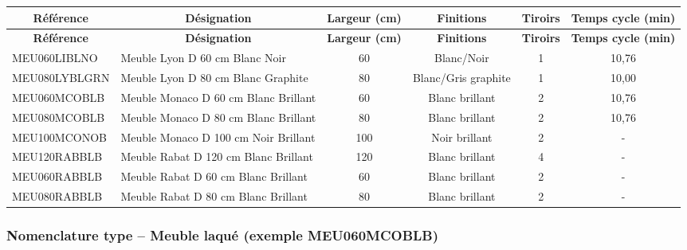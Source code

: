 \documentclass[12pt,a4paper]{article}
\begin{document}
\begin{longtable}{|p{4cm}|p{5cm}|c|c|c|c|}
\hline
\multicolumn{1}{|c|}{\textbf{Référence}} & \multicolumn{1}{c|}{\textbf{Désignation}} & \multicolumn{1}{c|}{\textbf{Largeur (cm)}} & \multicolumn{1}{c|}{\textbf{Finitions}} & \multicolumn{1}{c|}{\textbf{Tiroirs}} & \multicolumn{1}{c|}{\textbf{Temps cycle (min)}} \\
\hline
\endfirsthead
\hline
\multicolumn{1}{|c|}{\textbf{Référence}} & \multicolumn{1}{c|}{\textbf{Désignation}} & \multicolumn{1}{c|}{\textbf{Largeur (cm)}} & \multicolumn{1}{c|}{\textbf{Finitions}} & \multicolumn{1}{c|}{\textbf{Tiroirs}} & \multicolumn{1}{c|}{\textbf{Temps cycle (min)}} \\
\hline
\endhead
\hline
\endfoot
MEU060LIBLNO & Meuble Lyon D 60 cm Blanc Noir & 60 & Blanc/Noir & 1 & 10,76 \\
MEU080LYBLGRN & Meuble Lyon D 80 cm Blanc Graphite & 80 & Blanc/Gris graphite & 1 & 10,00 \\
MEU060MCOBLB & Meuble Monaco D 60 cm Blanc Brillant & 60 & Blanc brillant & 2 & 10,76 \\
MEU080MCOBLB & Meuble Monaco D 80 cm Blanc Brillant & 80 & Blanc brillant & 2 & 10,76 \\
MEU100MCONOB & Meuble Monaco D 100 cm Noir Brillant & 100 & Noir brillant & 2 & - \\
MEU120RABBLB & Meuble Rabat D 120 cm Blanc Brillant & 120 & Blanc brillant & 4 & - \\
MEU060RABBLB & Meuble Rabat D 60 cm Blanc Brillant & 60 & Blanc brillant & 2 & - \\
MEU080RABBLB & Meuble Rabat D 80 cm Blanc Brillant & 80 & Blanc brillant & 2 & - \\
\hline
\end{longtable}

\subsubsection{Nomenclature type – Meuble laqué (exemple MEU060MCOBLB)}
\end{document}

